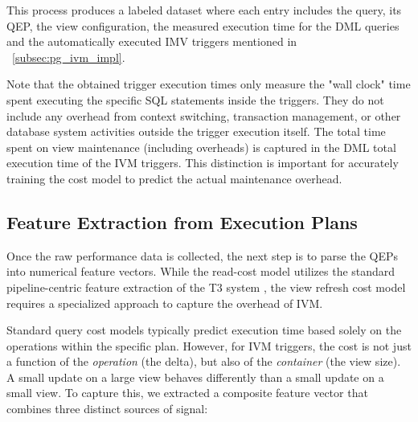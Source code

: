 This process produces a labeled dataset where each entry includes the query, its \ac{QEP}, the view configuration, the measured execution time for the \ac{DML} queries and the automatically executed \ac{IMV} triggers mentioned in ~\ref{subsec:pg_ivm_impl}.

Note that the obtained trigger execution times only measure the "wall clock" time spent executing the specific SQL statements inside the triggers. They do not include any overhead from context switching, transaction management, or other database system activities outside the trigger execution itself. The total time spent on view maintenance (including overheads) is captured in the \ac{DML} total execution time of the \ac{IVM} triggers. This distinction is important for accurately training the cost model to predict the actual maintenance overhead.

\subsection{Feature Extraction from Execution Plans}
\label{sec:feature_extraction}
Once the raw performance data is collected, the next step is to parse the \ac{QEP}s into numerical feature vectors. While the read-cost model utilizes the standard pipeline-centric feature extraction of the \ac{T3} system \cite{rieger2025t3}, the view refresh cost model requires a specialized approach to capture the overhead of \ac{IVM}.

Standard query cost models typically predict execution time based solely on the operations within the specific plan. However, for \ac{IVM} triggers, the cost is not just a function of the \textit{operation} (the delta), but also of the \textit{container} (the view size). A small update on a large view behaves differently than a small update on a small view. To capture this, we extracted a composite feature vector that combines three distinct sources of signal:

